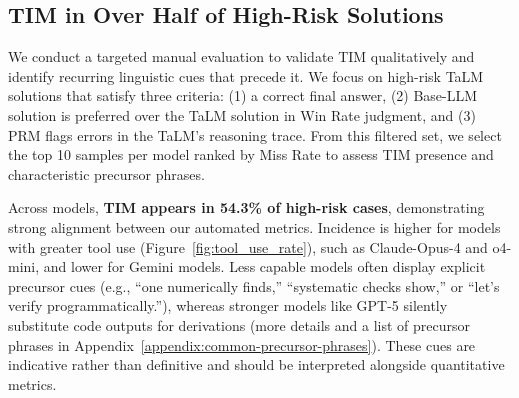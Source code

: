 \documentclass[11pt]{article}
\def \task{\textsc{TIM}\xspace}
\newcommand{\farima}[1]{{\color{orange}Farima: #1}}
\begin{document}
\subsection{\task{} in Over Half of High-Risk Solutions}
\label{sec:quality_analysis}
We conduct a targeted manual evaluation to validate \task{} qualitatively and identify recurring linguistic cues that precede it. We focus on high-risk TaLM solutions that satisfy three criteria: (1) a correct final answer, (2) Base-LLM solution is preferred over the TaLM solution in Win Rate judgment, and (3) PRM flags errors in the TaLM’s reasoning trace. From this filtered set, we select the top 10 samples per model ranked by Miss Rate to assess \task{} presence and characteristic precursor phrases.


Across models, \textbf{\task{} appears in 54.3\% of high-risk cases}, demonstrating strong alignment between our automated metrics. Incidence is higher for models with greater tool use (Figure~\ref{fig:tool_use_rate}), such as Claude-Opus-4 and o4-mini, and lower for Gemini models. Less capable models often display explicit precursor cues (e.g., ``one numerically finds,'' ``systematic checks show,'' or ``let's verify programmatically.''), whereas stronger models like GPT-5 silently substitute code outputs for derivations (more details and a list of precursor phrases in Appendix~\ref{appendix:common-precursor-phrases}). These cues are indicative rather than definitive and should be interpreted alongside quantitative metrics.

\end{document}
